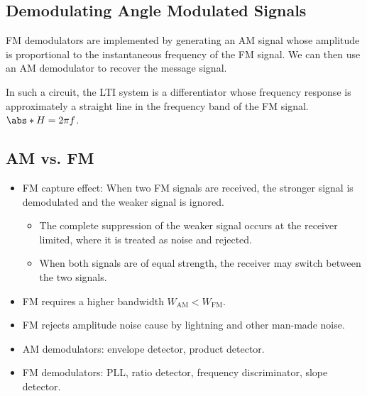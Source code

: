 \documentclass{article}
\begin{document}
\subsection{Demodulating Angle Modulated Signals}
FM demodulators are implemented by generating an AM signal whose
amplitude is proportional to the instantaneous frequency of the FM
signal. We can then use an AM demodulator to recover the message
signal.

In such a circuit, the LTI system is a differentiator whose frequency
response is approximately a straight line in the frequency band of the
FM signal. \(\abs*{H} = 2 \pi f\).
\subsection{AM vs. FM}
\begin{itemize}
    \item FM capture effect: When two FM signals are received, the
          stronger signal is demodulated and the weaker signal is
          ignored.
          \begin{itemize}
              \item The complete suppression of the weaker signal
                    occurs at the receiver limited, where it is treated
                    as noise and rejected.
              \item When both signals are of equal strength, the
                    receiver may switch between the two signals.
          \end{itemize}
    \item FM requires a higher bandwidth \(W_{\mathrm{AM}} <
          W_{\mathrm{FM}}\).
    \item FM rejects amplitude noise cause by lightning and other
          man-made noise.
    \item AM demodulators: envelope detector, product detector.
    \item FM demodulators: PLL, ratio detector, frequency
          discriminator, slope detector.
\end{itemize}
\end{document}
